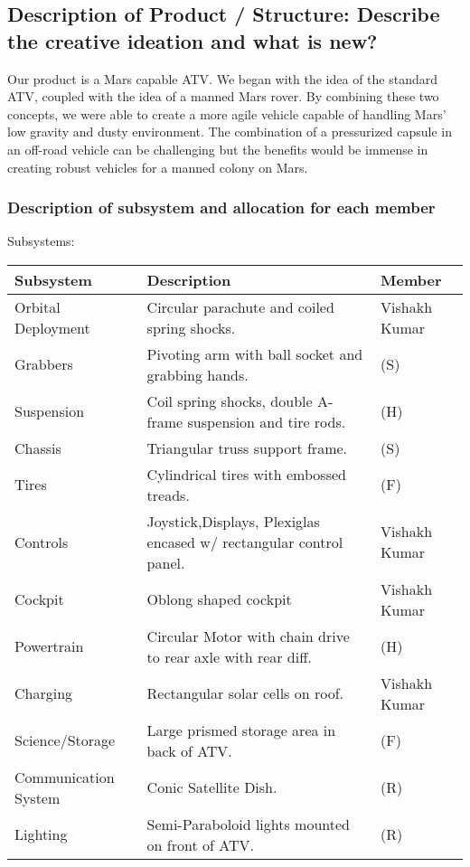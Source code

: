 \subsection{Description of Product / Structure: Describe the creative ideation and what is new?}

Our product is a Mars capable ATV. We began with the idea of the standard ATV, coupled with the idea of a manned Mars rover. By combining these two concepts, we were able to create a more agile vehicle capable of handling Mars’ low gravity and dusty environment. The combination of a pressurized capsule in an off-road vehicle can be challenging but the benefits would be immense in creating robust vehicles for a manned colony on Mars.

\subsubsection{Description of subsystem and allocation for each member}

Subsystems:
\begin{center}
\begin{tabular}{lll}
\hline
Subsystem & Description & Member\\
\hline
Orbital Deployment & Circular parachute and coiled spring shocks. & Vishakh Kumar\\
Grabbers & Pivoting arm with ball socket and grabbing hands. & (S)\\
Suspension & Coil spring shocks, double A-frame suspension and tire rods. & (H)\\
Chassis & Triangular truss support frame. & (S)\\
Tires & Cylindrical tires with embossed treads. & (F)\\
Controls & Joystick,Displays, Plexiglas encased w/ rectangular control panel. & Vishakh Kumar\\
Cockpit & Oblong shaped cockpit & Vishakh Kumar\\
Powertrain & Circular Motor with chain drive to rear axle with rear diff. & (H)\\
Charging & Rectangular solar cells on roof. & Vishakh Kumar\\
Science/Storage & Large prismed storage area in back of ATV. & (F)\\
Communication System & Conic Satellite Dish. & (R)\\
Lighting & Semi-Paraboloid lights mounted on front of ATV. & (R)\\
\hline
\end{tabular}
\end{center}

